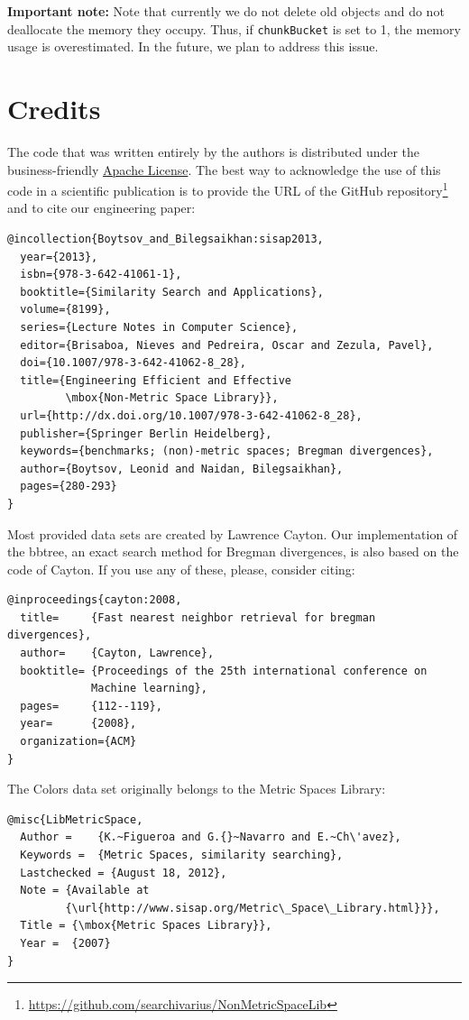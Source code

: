 \documentclass[runningheads,a4paper]{llncs}
\newcommand{\ttt}[1]{\texttt{#1}}
\begin{document}
{\textbf{Important note:}
Note that currently we do not delete old objects and do not deallocate the memory 
they occupy. Thus, 
if 
\ttt{chunkBucket} is set to 1,
the memory usage is overestimated.
In the future, we plan to address this issue.

\section{Credits}\label{SectionCredits}
The code that was written entirely by the authors is distributed 
under the business-friendly \href{http://apache.org/licenses/LICENSE-2.0}{Apache License}. 
The best way to acknowledge the use of this code 
in a scientific publication is to 
provide the URL of the GitHub repository\footnote{\url{https://github.com/searchivarius/NonMetricSpaceLib}} 
and to cite our engineering paper:
\begin{verbatim}
@incollection{Boytsov_and_Bilegsaikhan:sisap2013,
  year={2013},
  isbn={978-3-642-41061-1},
  booktitle={Similarity Search and Applications},
  volume={8199},
  series={Lecture Notes in Computer Science},
  editor={Brisaboa, Nieves and Pedreira, Oscar and Zezula, Pavel},
  doi={10.1007/978-3-642-41062-8_28},
  title={Engineering Efficient and Effective 
         \mbox{Non-Metric Space Library}},
  url={http://dx.doi.org/10.1007/978-3-642-41062-8_28},
  publisher={Springer Berlin Heidelberg},
  keywords={benchmarks; (non)-metric spaces; Bregman divergences},
  author={Boytsov, Leonid and Naidan, Bilegsaikhan},
  pages={280-293}
}
\end{verbatim}


Most provided data sets are created by Lawrence Cayton.
Our implementation of the bbtree, 
an exact search method for Bregman divergences,
is also based on the code of Cayton.
If you use any of these, please, consider citing:
\begin{verbatim}
@inproceedings{cayton:2008,
  title=     {Fast nearest neighbor retrieval for bregman divergences},
  author=    {Cayton, Lawrence},
  booktitle= {Proceedings of the 25th international conference on 
             Machine learning},
  pages=     {112--119},
  year=      {2008},
  organization={ACM}
}
\end{verbatim}

The Colors data set originally belongs to the Metric Spaces Library: 
\begin{verbatim}
@misc{LibMetricSpace, 
  Author =    {K.~Figueroa and G.{}~Navarro and E.~Ch\'avez}, 
  Keywords =  {Metric Spaces, similarity searching}, 
  Lastchecked = {August 18, 2012}, 
  Note = {Available at 
         {\url{http://www.sisap.org/Metric\_Space\_Library.html}}}, 
  Title = {\mbox{Metric Spaces Library}}, 
  Year =  {2007}
} 
\end{verbatim}

}
\end{document}
